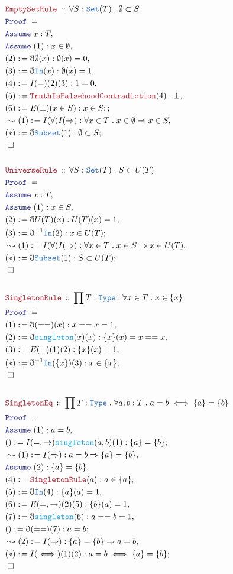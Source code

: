 \documentclass[12pt]{scrartcl}
\newcommand{\TYPE}[1]{\textcolor{NavyBlue}{\mathtt{#1}}}
\newcommand{\FUNC}[1]{\textcolor{Cerulean}{\mathtt{#1}}}
\newcommand{\LOGIC}[1]{\textcolor{Blue}{\mathtt{#1}}}
\newcommand{\THM}[1]{\textcolor{Maroon}{\mathtt{#1}}}
\renewcommand{\.}{\; . \;}
\newcommand{\de}{: \kern 0.1pc =}
\newcommand{\Theorem}[2]{& \THM{#1} \, :: \, #2 \\ & \Proof = \\ }
\newcommand{\Page}[1]{ \begin{align*} #1 \end{align*}   }
\newcommand{ \bd }{ \ByDef }
\newcommand{\Type}{\TYPE{Type}}
\newcommand{\Set}{\TYPE{Set}}
\newcommand{\Say}[3]{& #1 \de #2 : #3, \\}
\newcommand{\Conclude}[3]{& #1 \de #2 : #3; \\}
\newcommand{\Derive}[3]{& \leadsto #1 \de #2 : #3, \\}
\newcommand{\A}{\LOGIC{Assume} \;}
\newcommand{\Assume}[2]{& \A #1 : #2, \\}
\newcommand{\QED}{\; \square}
\newcommand{\EndProof}{& \QED \\}
\newcommand{\ByDef}{\eth}
\newcommand{\Proof}{\LOGIC{Proof} \; }
\begin{document}
\Page{
	\Theorem{EmptySetRule}{  \forall S : \Set(T) \. \emptyset \subset S }
	\Assume{x}{T}
	\Assume{(1)}{x \in \emptyset}
	\Say{(2)}{\bd \emptyset (x)}{\emptyset(x) = 0}
	\Say{(3)}{ \bd \TYPE{In}(x)}{\emptyset(x) = 1}
	\Say{(4)}{ I(=)(2)(3)}{1 = 0}
	\Say{(5)}{\THM{TruthIsFalsehoodContradiction}(4)}{\bot }
	\Conclude{(6)}{E(\bot)(x \in S )}{ x \in S ;  }
	\Derive{(1)}{ I(\forall)I(\Rightarrow) }
	{\forall x \in T \. x \in \emptyset  \Rightarrow  x \in S}
	\Conclude{(*)}{\bd\TYPE{Subset}(1)}{\emptyset \subset S}
	\EndProof
	\\
	\Theorem{UniverseRule}{ \forall S : \Set(T) \. S \subset U(T)}
	\Assume{x}{T}
	\Assume{(1)}{x \in S}
	\Say{(2)}{\bd U(T)(x)}{ U(T)(x) = 1}
	\Conclude{(3)}{\bd^{-1} \TYPE{In}(2)}{x \in U(T)}
	\Derive{(1)}{ I(\forall)I(\Rightarrow)}{\forall x \in T \. x \in S \Rightarrow x \in U(T)}
	\Conclude{(*)}{\bd\TYPE{Subset}(1)}{S \subset U(T)}
	\EndProof
	\\
	\Theorem{SingletonRule}{\prod T : \Type \. \forall x \in T \. x \in \{ x \}  }
	\Say{(1)}{\bd(==)(x)}{x == x = 1}
	\Say{(2)}{\bd \FUNC{singleton}(x)(x)}{ \{x\}(x) = x == x }
	\Say{(3)}{E(=)(1)(2)}{\{x\}(x) = 1}
	\Conclude{(*)}{\bd^{-1} \TYPE{In}(\{x\})(3)}{x \in \{x\}}
	\EndProof
	\\
	\Theorem{SingletonEq}{\prod T : \Type \. \forall a,b : T \. a = b \iff \{a\} = \{b\}}
	\Assume{(1)}{a = b}
	\Conclude{()}{I(=,\to)\FUNC{singleton}(a,b)(1)}{\{a\} = \{b\}}
	\Derive{(1)}{I(\Rightarrow)}{a = b \Rightarrow \{a\} = \{b\}}
	\Assume{(2)}{ \{ a \} = \{ b \} }
	\Say{(4)}{\THM{SingletonRule}(a)}{a \in \{a\}}
	\Say{(5)}{\bd \TYPE{In}(4)}{\{a\}(a) = 1}
	\Say{(6)}{E(=,\to)(2)(5)}{\{b\}(a) = 1}
	\Say{(7)}{\bd \FUNC{singleton}(6)}{ a == b = 1}
	\Conclude{()}{\bd(==)(7)}{a = b}
	\Derive{(2)}{I(\Rightarrow)}{\{a\} = \{b\} \Rightarrow a = b}
	\Conclude{(*)}{I(\iff)(1)(2)}{a = b \iff \{a\} = \{b\}}
	\EndProof
}
\end{document}
